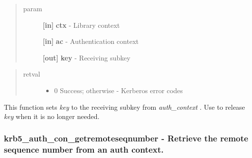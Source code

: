 \documentclass[letterpaper,10pt,english]{sphinxmanual}
\begin{document}
\begin{quote}\begin{description}
\item[{param}] \leavevmode
\textbf{{[}in{]}} \textbf{ctx} - Library context

\textbf{{[}in{]}} \textbf{ac} - Authentication context

\textbf{{[}out{]}} \textbf{key} - Receiving subkey

\end{description}\end{quote}
\begin{quote}\begin{description}
\item[{retval}] \leavevmode\begin{itemize}
\item {} 
0   Success; otherwise - Kerberos error codes

\end{itemize}

\end{description}\end{quote}

This function sets \emph{key} to the receiving subkey from \emph{auth\_context} . Use {\hyperref[appdev/refs/api/krb5_k_free_key:krb5_k_free_key]{}} to release \emph{key} when it is no longer needed.


\subsubsection{krb5\_auth\_con\_getremoteseqnumber -  Retrieve the remote sequence number from an auth context.}
\label{appdev/refs/api/krb5_auth_con_getremoteseqnumber:krb5-auth-con-getremoteseqnumber-retrieve-the-remote-sequence-number-from-an-auth-context}\label{appdev/refs/api/krb5_auth_con_getremoteseqnumber::doc}

\begin{fulllineitems}
\label{appdev/refs/api/krb5_auth_con_getremoteseqnumber:krb5_auth_con_getremoteseqnumber}
\end{fulllineitems}
\end{document}
